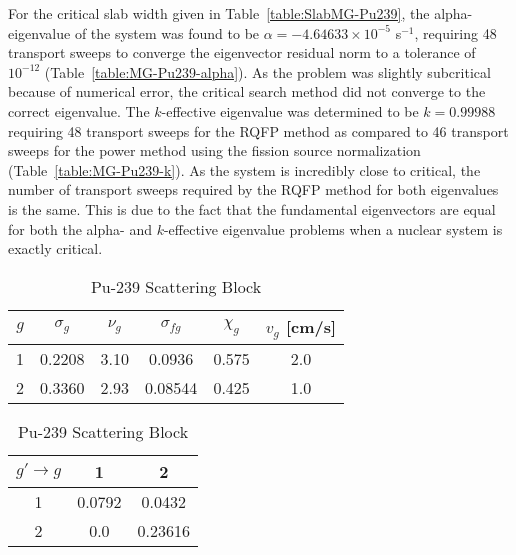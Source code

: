 For the critical slab width given in Table~\ref{table:SlabMG-Pu239}, the alpha-eigenvalue of the system was found to be $\alpha = -4.64633 \times 10^{-5}$ s$^{-1}$, requiring 48 transport sweeps to converge the eigenvector residual norm to a tolerance of $10^{-12}$ (Table~\ref{table:MG-Pu239-alpha}). As the problem was slightly subcritical because of numerical error, the critical search method did not converge to the correct eigenvalue. The $k$-effective eigenvalue was determined to be $k=0.99988$ requiring 48 transport sweeps for the RQFP method as compared to 46 transport sweeps for the power method using the fission source normalization (Table~\ref{table:MG-Pu239-k}). As the system is incredibly close to critical, the number of transport sweeps required by the RQFP method for both eigenvalues is the same. This is due to the fact that the fundamental eigenvectors are equal for both the alpha- and $k$-effective eigenvalue problems when a nuclear system is exactly critical.

\begin{table}[!htbp]
	\caption{Sood Criticality Benchmark Problem 45 Cross Sections (cm$^{-1}$) in \cite{sood2003analytical}}
	\label{table:Pu239-TwoGroup}
	\begin{subtable}[!htbp]{1.0\textwidth}
		\centering{}
		\begin{tabular}{@{}cccccc@{}}\toprule
			$g$ & $\sigma_{g} $ & $\nu_{g}$ & $\sigma_{fg}$ & $\chi_{g}$ & $v_{g}$ [cm/s] \\ 
        			\midrule
			1 & 0.2208 & 3.10 & 0.0936 & 0.575 & 2.0 \\
			2 & 0.3360 & 2.93 & 0.08544 & 0.425 & 1.0 \\
			\bottomrule
		\end{tabular}
	\caption{Pu-239 Cross Sections}
	\label{table:TwoGroupPu239}
	\end{subtable}%
	\vspace{0.25cm}
	\begin{subtable}[!htbp]{1.0\textwidth}
	\centering{}
	\begin{tabular}{@{}ccc@{}}\toprule
	$g' \rightarrow g$ & 1 & 2 \\ 
        \midrule
	1 & 0.0792 & 0.0432 \\
	2 & 0.0 & 0.23616 \\
	\bottomrule
	\end{tabular}
	\caption{Pu-239 Scattering Block}
	\label{table:TwoGroupPu239_ScatterXS}
	\end{subtable}
\end{table}


